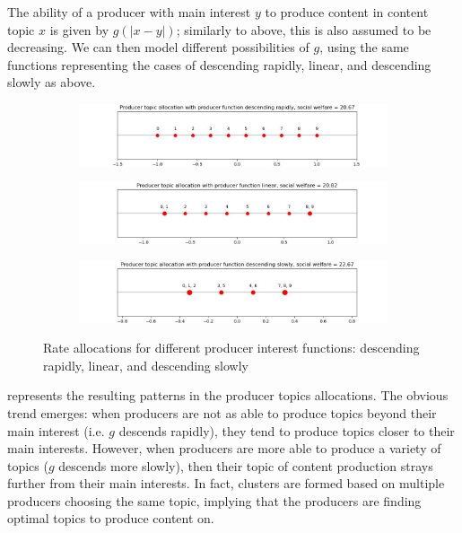\documentclass[11pt, letterpaper]{article}
\begin{document}
The ability of a producer with main interest \(y\) to produce content in content topic \(x\) is given by \(g(|x-y|)\); similarly to above, this is also assumed to be decreasing. We can then model different possibilities of \(g\), using the same functions representing the cases of descending rapidly, linear, and descending slowly as above. 

\begin{figure}[h]
\centering
\begin{subfigure}[b]{0.7\textwidth}
    \includegraphics[width=\linewidth]{"figures/g/descending rapidly_topics.jpg"}
\end{subfigure}
\begin{subfigure}[b]{0.7\textwidth}
    \includegraphics[width=\linewidth]{"figures/g/linear_topics.jpg"}
\end{subfigure}
\begin{subfigure}[b]{0.7\textwidth}
    \includegraphics[width=\linewidth]{"figures/g/descending slowly_topics.jpg"}
\end{subfigure}
\caption{Rate allocations for different producer interest functions: descending rapidly, linear, and descending slowly}
\label{fig:g}
\end{figure}

 represents the resulting patterns in the producer topics allocations. The obvious trend emerges: when producers are not as able to produce topics beyond their main interest (i.e. \(g\) descends rapidly), they tend to produce topics closer to their main interests. However, when producers are more able to produce a variety of topics (\(g\) descends more slowly), then their topic of content production strays further from their main interests. In fact, clusters are formed based on multiple producers choosing the same topic, implying that the producers are finding optimal topics to produce content on.
\end{document}
